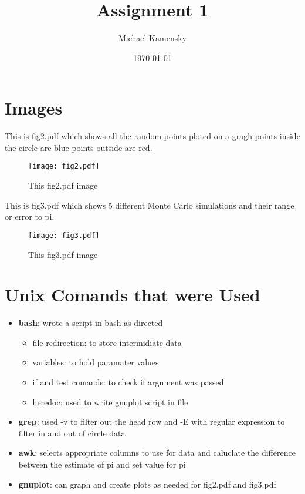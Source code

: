 \documentclass[11pt]{article} %
\title{Assignment 1}
\author{Michael Kamensky}
\date{\today} %
\begin{document}
\maketitle %
\section{Images}
This is fig2.pdf which shows all the random points ploted on a gragh points inside the circle are blue points outside are red.
\begin{figure}[htb]
\begin{center}
\texttt{[image: fig2.pdf]}
\caption{This fig2.pdf image}
\end{center}
\end{figure}

This is fig3.pdf which shows 5 different Monte Carlo simulations and their range or error to pi.
\begin{figure}[htb]
\begin{center}
\texttt{[image: fig3.pdf]}
\caption{This fig3.pdf image}
\end{center}
\end{figure}
\section{Unix Comands that were Used}
\begin{itemize}
  \item \textbf{bash}: wrote a script in bash as directed
  \begin{itemize}
     \item file redirection: to store intermidiate data
     \item variables: to hold paramater values
     \item if and test comands: to check if argument was passed
     \item heredoc: used to write gnuplot script in file
  \end{itemize}
  \item \textbf{grep}: used -v to filter out the head row and -E with regular expression to filter in and out of circle data
  \item \textbf{awk}: selects appropriate columns to use for data and caluclate the difference between the estimate of pi and set value for pi
  \item \textbf{gnuplot}: can graph and create plots as needed for fig2.pdf and fig3.pdf
\end{itemize}
\end{document}
